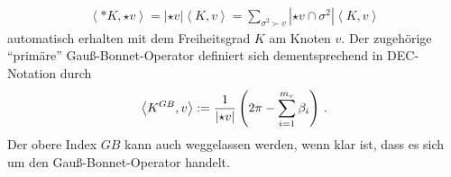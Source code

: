   \begin{align}
    \left\langle *K , \star v \right\rangle = \left| \star v \right|\left\langle K, v \right\rangle
                          = \sum_{\sigma^{2}\succ v} \left| \star v \cap \sigma^{2} \right| \left\langle K, v \right\rangle
  \end{align}
  automatisch erhalten mit dem Freiheitsgrad \( K \) am Knoten \( v \).
  Der zugehörige "`primäre"' Gauß-Bonnet-Operator definiert sich dementsprechend in DEC-Notation durch
  \begin{align}
    \left\langle K^{GB},v \right\rangle := \frac{1}{\left| \star v \right|} \left( 2\pi - \sum_{i=1}^{m_{v}}\beta_{i} \right) \,\text{.}
  \end{align}
  Der obere Index \( GB \) kann auch weggelassen werden, wenn klar ist, dass es sich um den Gauß-Bonnet-Operator handelt.

